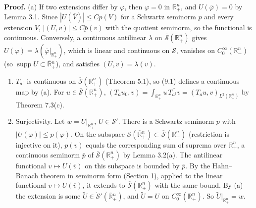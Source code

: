 \documentclass[
  11pt,
]{article}
\begin{document}
\textbf{Proof.} (a) If two extensions differ by \(\varphi\), then
\(\varphi=0\) in \(\mathbb R^n_+\), and \(U(\overline\varphi)=0\) by
Lemma 3.1. Since \(|U(\overline V)|\leq Cp(V)\) for a Schwartz seminorm
\(p\) and every extension \(V\), \(|(U,v)|\leq C\bar p(v)\) with the
quotient seminorm, so the functional is continuous. Conversely, a
continuous antilinear \(\lambda\) on
\(\overline{\mathcal S}(\mathbb R^n_+)\) gives
\(U(\varphi)=\lambda(\overline\varphi|_{\mathbb R^n_+})\), which is
linear and continuous on \(\mathcal S\), vanishes on
\(C_0^\infty(\mathbb R^n_-)\) (so
\(\operatorname{supp}U\subset\overline{\mathbb R}{}^n_+\)), and
satisfies \((U,v)=\lambda(v)\).

\begin{enumerate}
\def\labelenumi{(\alph{enumi})}
\setcounter{enumi}{1}
\item
  \(T_{a^\dagger}\) is continuous on
  \(\overline{\mathcal S}(\mathbb R^n_+)\) (Theorem 5.1), so (9.1)
  defines a continuous map by (a). For
  \(u\in\overline{\mathcal S}(\mathbb R^n_+)\),
  \((T_au_0,v)=\int_{\mathbb R^n_+}u\,\overline{T_{a^\dagger}v}=(T_au,v)_{L^2(\mathbb R^n_+)}\)
  by Theorem 7.3(c).
\item
  Surjectivity. Let \(w=U|_{\mathbb R^n_+}\), \(U\in\mathcal S'\). There
  is a Schwartz seminorm \(p\) with \(|U(\varphi)|\leq p(\varphi)\). On
  the subspace
  \(\dot{\mathcal S}(\overline{\mathbb R}{}^n_+)\subset\overline{\mathcal S}(\mathbb R^n_+)\)
  (restriction is injective on it), \(p(v)\) equals the corresponding
  sum of suprema over \(\mathbb R^n_+\), a continuous seminorm
  \(\bar p\) of \(\overline{\mathcal S}(\mathbb R^n_+)\) by Lemma
  3.2(a). The antilinear functional \(v\mapsto U(\overline v)\) on this
  subspace is bounded by \(\bar p\). By the Hahn--Banach theorem in
  seminorm form (Section 1), applied to the linear functional
  \(v\mapsto\overline{U(\overline v)}\), it extends to
  \(\overline{\mathcal S}(\mathbb R^n_+)\) with the same bound. By (a)
  the extension is some
  \(\tilde U\in\dot{\mathcal S}'(\overline{\mathbb R}{}^n_+)\), and
  \(\tilde U=U\) on \(C_0^\infty(\mathbb R^n_+)\). So
  \(\tilde U|_{\mathbb R^n_+}=w\).
\end{enumerate}
\end{document}
